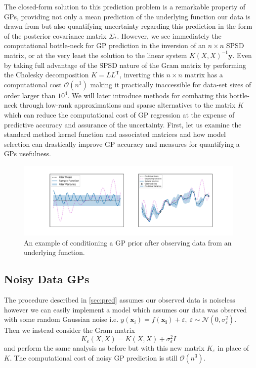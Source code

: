 \documentclass[10pt,a4paper]{article}
\numberwithin{equation}{section}
\theoremstyle{plain}
\theoremstyle{definition}
\theoremstyle{own}
\begin{document}
The closed-form solution to this prediction problem is a remarkable property of GPs, providing not only a mean prediction of the underlying function our data is drawn from but also quantifying uncertainty regarding this prediction in the form of the posterior covariance matrix $\Sigma_*$. However, we see immediately the computational bottle-neck for GP prediction in the inversion of an $n \times n$ SPSD matrix, or at the very least the solution to the linear system $K(X,X)^{-1}\mathbf{y}$. Even by taking full advantage of the SPSD nature of the Gram matrix by performing the Cholesky decomposition $K = LL^{\text{T}}$, inverting this $n \times n$ matrix has a computational cost $\mathcal{O}(n^3)$ making it practically inaccessible for data-set sizes of order larger than $10^4$. We will later introduce methods for combating this bottle-neck through low-rank approximations and sparse alternatives to the matrix $K$ which can reduce the computational cost of GP regression at the expense of predictive accuracy and assurance of the uncertainty. First, let us examine the standard method kernel function and associated matrices and how model selection can drastically improve GP accuracy and measures for quantifying a GPs usefulness.
\begin{figure}[H]
\includegraphics[width=1.0\textwidth]{gp_ex}
\caption{An example of conditioning a GP prior after observing data from an underlying function.}
\label{gp_ex}
\end{figure}
\subsection{Noisy Data GPs} \label{sec:noisypred}
The procedure described in \ref{sec:pred} assumes our observed data is noiseless however we can easily implement a model which assumes our data was observed with some random Gaussian noise i.e. $y(\mathbf{x}_i) = f(\mathbf{x_i}) + \varepsilon,~ \varepsilon \sim \mathcal{N}(0, \sigma_\varepsilon^2)$. Then we instead consider the Gram matrix \[K_\varepsilon(X,X) = K(X,X) + \sigma_\varepsilon^2 I\] and perform the same analysis as before but with this new matrix $K_\varepsilon$ in place of $K$. The computational cost of noisy GP prediction is still $\mathcal{O}(n^3)$.
\end{document}
